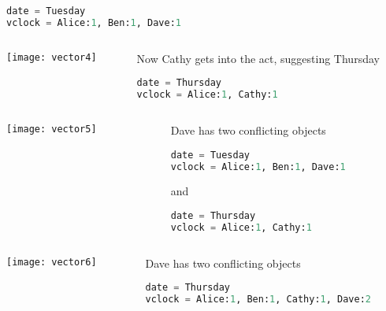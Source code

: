 \documentclass[aspectratio=169, 15pt,usenames,dvipsnames]{beamer}
\begin{document}
{\begin{gdblank}
\begin{columns}
\begin{column}{0.5\textwidth}
			\begin{lstlisting}[language=Python]
date = Tuesday
vclock = Alice:1, Ben:1, Dave:1
			\end{lstlisting}
		\end{column}	
	\end{columns} 
	\end{gdblank}
	\cprotEnv\begin{gdblank}
	\begin{columns}
		\begin{column}{0.5\textwidth}
			\texttt{[image: vector4]}			
		\end{column}
		\begin{column}{0.5\textwidth}				
			Now Cathy gets into the act, suggesting Thursday
			\begin{lstlisting}[language=Python]
date = Thursday
vclock = Alice:1, Cathy:1
			\end{lstlisting}
		\end{column}	
	\end{columns} 
	\end{gdblank}
	\cprotEnv\begin{gdblank}
	\begin{columns}
		\begin{column}{0.5\textwidth}
			\texttt{[image: vector5]}			
		\end{column}
		\begin{column}{0.5\textwidth}				
			Dave has two conflicting objects
			\begin{lstlisting}[language=Python]
date = Tuesday
vclock = Alice:1, Ben:1, Dave:1
			\end{lstlisting}
			and
			\begin{lstlisting}[language=Python]
date = Thursday
vclock = Alice:1, Cathy:1
			\end{lstlisting}
		\end{column}	
	\end{columns} 
	\end{gdblank}
	\cprotEnv\begin{gdblank}
	\begin{columns}
		\begin{column}{0.5\textwidth}
			\texttt{[image: vector6]}			
		\end{column}
		\begin{column}{0.5\textwidth}				
			Dave has two conflicting objects
			\begin{lstlisting}[language=Python]
date = Thursday
vclock = Alice:1, Ben:1, Cathy:1, Dave:2

\end{lstlisting}
\end{column}
\end{columns}
\end{gdblank}}
\end{document}
